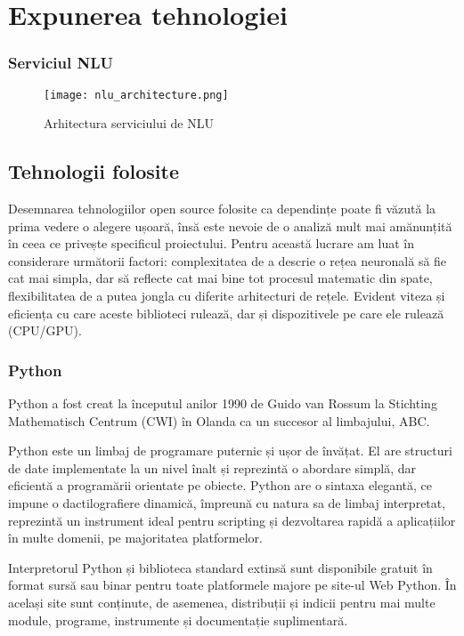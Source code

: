 \chapter{Expunerea tehnologiei}

\subsection{Serviciul NLU}
\begin{figure}[h]
	\texttt{[image: nlu\_architecture.png]}
	\caption{Arhitectura serviciului de NLU}
	\label{fig:nlu_arch}
\end{figure}

\section{Tehnologii folosite}

Desemnarea tehnologiilor open source folosite ca dependințe poate fi văzută la prima vedere o alegere ușoară, însă este nevoie de o analiză mult mai amănunțită în ceea ce privește specificul proiectului.
Pentru această lucrare am luat în considerare următorii factori: complexitatea de a descrie o rețea neuronală să fie cat mai simpla, dar să reflecte cat mai bine tot procesul matematic din spate, flexibilitatea de a putea jongla cu diferite arhitecturi de rețele. Evident viteza și eficiența cu care aceste biblioteci rulează, dar și dispozitivele pe care ele rulează (CPU/GPU).

\subsection{Python}

Python a fost creat la începutul anilor 1990 de Guido van Rossum la Stichting Mathematisch Centrum (CWI) în Olanda ca un succesor al limbajului, ABC. \cite{pythonhistory}

Python este un limbaj de programare puternic și ușor de învățat. El are structuri de date implementate la un nivel înalt și reprezintă o abordare simplă, dar eficientă a programării orientate pe obiecte. Python are o sintaxa elegantă, ce impune o dactilografiere dinamică, împreună cu natura sa de limbaj interpretat, reprezintă un instrument ideal pentru scripting și dezvoltarea rapidă a aplicațiilor în multe domenii, pe majoritatea platformelor.

Interpretorul Python și biblioteca standard extinsă sunt disponibile gratuit în format sursă sau binar pentru toate platformele majore pe site-ul Web Python. În același site sunt conținute, de asemenea, distribuții și indicii pentru mai multe module, programe, instrumente și documentație suplimentară.


